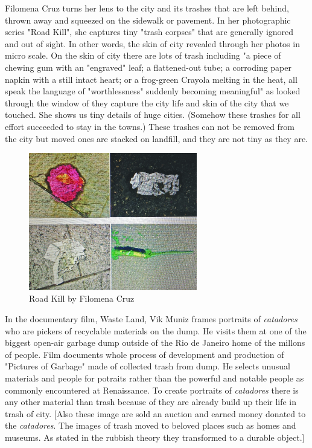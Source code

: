Filomena Cruz turns her lens to the city and its trashes that are left behind, thrown away and squeezed on the sidewalk or pavement. In her photographic series "Road Kill", she captures tiny "trash corpses" that are generally ignored and out of sight. In other words, the skin of city revealed through her photos in micro scale. On the skin of city there are lots of trash including "a piece of chewing gum with an "engraved" leaf; a flattened-out tube; a corroding paper napkin with a still intact heart; or a frog-green Crayola melting in the heat, all speak the language of "worthlessness" suddenly becoming meaningful" as looked through the window of they capture the city life and skin of the city that we touched. She shows us tiny details of huge cities. (Somehow these trashes for all effort succeeded to stay in the towns.) These trashes can not be removed from the city but moved ones are stacked on landfill, and they are not tiny as they are.

\begin{figure}[h!]
  \centering
  \includegraphics[height=6cm]{graphics/FilomenaCruz_RoadKill_ReVista.jpg}
  \caption{Road Kill by Filomena Cruz}
  \label{fig:FilomenaCruz_RoadKill_ReVista}
\end{figure}

In the documentary film, Waste Land, Vik Muniz frames portraits of \textit{catadores} who are pickers of recyclable materials on the dump. He visits them at one of the biggest open-air garbage dump outside of the Rio de Janeiro home of the millons of people. Film documents whole process of development and production of "Pictures of Garbage" made of collected trash from dump. He selects unusual materials and people for potraits rather than the powerful and notable people as commonly encountered at Renaissance. To create portraits of \textit{catadores} there is any other material than trash because of they are already build up their life in trash of city. [Also these image are sold an auction and earned money donated to the \textit{catadores}. The images of trash moved to beloved places such as homes and museums. As stated in the rubbish theory they transformed to a durable object.]

